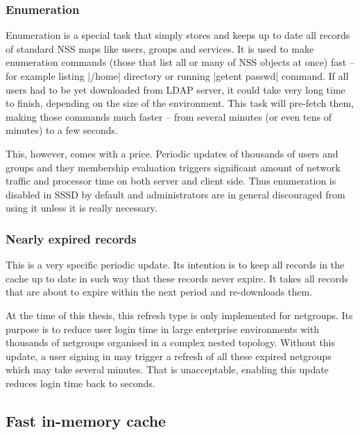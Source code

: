 
\subsubsection{Enumeration}
\label{sssd:cache:periodic:enum}

Enumeration is a special task that simply stores and keeps up to date all
records of standard NSS maps like users, groups and services. It is used to make
enumeration commands (those that list all or many of NSS objects at once) fast
-- for example listing |/home| directory or running |getent passwd| command. If
all users had to be yet downloaded from LDAP server, it could take very long
time to finish, depending on the size of the environment. This task will
pre-fetch them, making those commands much faster -- from several minutes (or
even tens of minutes) to a few seconds.

This, however, comes with a price. Periodic updates of thousands of users and
groups and they membership evaluation triggers significant amount of network
traffic and processor time on both server and client side. Thus enumeration is
disabled in SSSD by default and administrators are in general discouraged from
using it unless it is really necessary.

\subsubsection{Nearly expired records}
\label{sssd:cache:periodic:expired}

This is a very specific periodic update. Its intention is to keep all records in
the cache up to date in such way that these records never expire. It takes all
records that are about to expire within the next period and re-downloads them.

At the time of this thesis, this refresh type is only implemented for netgroups.
Its purpose is to reduce user login time in large enterprise environments with
thousands of netgroups organised in a complex nested topology. Without this
update, a user signing in may trigger a refresh of all these expired netgroups
which may take several minutes. That is unacceptable, enabling this update
reduces login time back to seconds.

\subsection{Fast in-memory cache}
\label{sssd:cache:memory}

